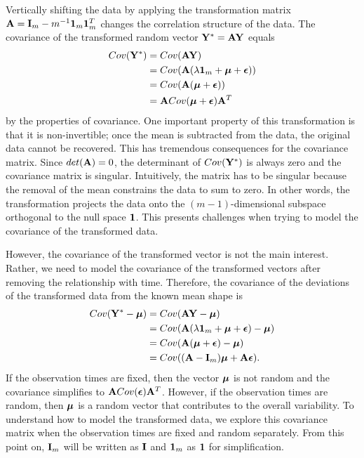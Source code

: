 Vertically shifting the data by applying the transformation matrix $\mathbf A = \mathbf I_{m}-m^{-1}\mathbf 1_{m}\mathbf 1_{m}^{T}$ changes the correlation structure of the data. The covariance of the transformed random vector $\mathbf Y^{*}=\mathbf A\mathbf Y$ equals
\begin{align*}
Cov(\mathbf Y^{*})&=Cov(\mathbf A\mathbf Y)\\
&=Cov( \mathbf A(\lambda\mathbf 1_{m}+ \boldsymbol\mu + \boldsymbol\epsilon))\\
&=Cov( \mathbf A( \boldsymbol\mu + \boldsymbol\epsilon))\\
&= \mathbf ACov( \boldsymbol\mu + \boldsymbol\epsilon)\mathbf A^{T}
\end{align*}
by the properties of covariance. One important property of this transformation is that it is non-invertible; once the mean is subtracted from the data, the original data cannot be recovered. This has tremendous consequences for the covariance matrix. Since $det(\mathbf A) = 0$, the determinant of $Cov(\mathbf Y^{*})$ is always zero and the covariance matrix is singular. Intuitively, the matrix has to be singular because the removal of the mean constrains the data to sum to zero. In other words, the transformation projects the data onto the $(m-1)$-dimensional subspace orthogonal to the null space $\mathbf 1$. This presents challenges when trying to model the covariance of the transformed data. 

However, the covariance of the transformed vector is not the main interest. Rather, we need to model the covariance of the transformed vectors after removing the relationship with time. Therefore, the covariance of the deviations of the transformed data from the known mean shape is
\begin{align*}
Cov(\mathbf Y^{*} - \boldsymbol\mu) &= Cov(\mathbf A\mathbf Y - \boldsymbol\mu)\\
&= Cov(\mathbf A(\lambda\mathbf 1_{m} + \boldsymbol\mu + \boldsymbol\epsilon) - \boldsymbol\mu)\\
&= Cov(\mathbf A(\boldsymbol\mu + \boldsymbol\epsilon) - \boldsymbol\mu)\\
&= Cov((\mathbf A-\mathbf I_{m})\boldsymbol\mu + \mathbf A \boldsymbol\epsilon).
\end{align*}
If the observation times are fixed, then the vector $\boldsymbol \mu$ is not random and the covariance simplifies to $\mathbf A Cov(\boldsymbol\epsilon)\mathbf A^{T}$. However, if the observation times are random, then $\boldsymbol \mu$ is a random vector that contributes to the overall variability. To understand how to model the transformed data, we explore this covariance matrix when the observation times are fixed and random separately. From this point on, $\mathbf I_{m}$ will be written as $\mathbf I$ and $\mathbf 1_{m}$ as $\mathbf 1$ for simplification.

